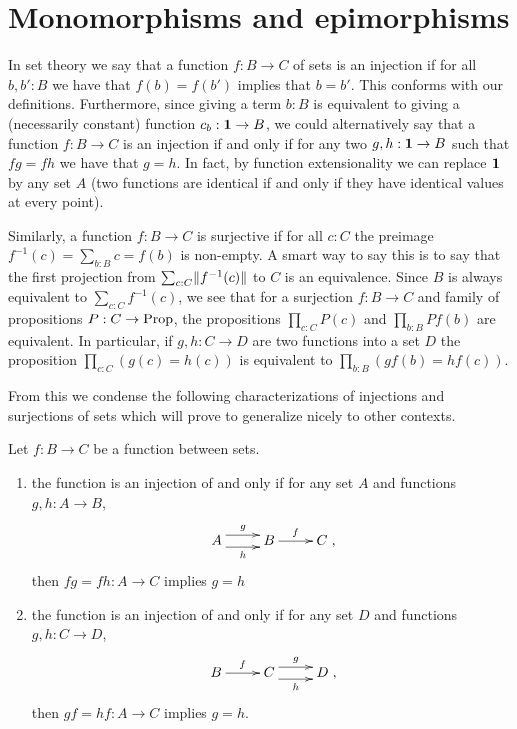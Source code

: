 \section{Monomorphisms and epimorphisms}
\label{sec:monoepi}


In set theory we say that a function $f:B\to C$ of sets is an injection if for all $b,b':B$ we have that $f(b)=f(b')$ implies that  $b=b'$.  This conforms with our definitions.
Furthermore, since giving a term $b:B$ is equivalent to giving a (necessarily constant) function $c_b:\mathbf{1}\to B$, we could alternatively say that a function $f:B\to C$ is an injection if and only if for any two $g,h:\mathbf{1}\to B$ such that $fg=fh$ we have that $g=h$.  In fact, by function extensionality we can replace $\mathbf{1}$ by any set $A$ (two functions are identical if and only if they have identical values at every point).

Similarly, a function $f:B\to C$ is surjective if for all $c:C$ the preimage $f^{-1}(c)=\sum_{b:B}c=f(b)$ is non-empty.  A smart way to say this is to say that the first projection from $\sum_{c:C}\lVert f^{-1}(c)\rVert$ to $C$ is an equivalence.  Since $B$ is always equivalent to $\sum_{c:C}f^{-1}(c)$, we see that for a surjection $f:B\to C$ and family of propositions $P:C\to \mathord{\mathrm{Prop}}$, the propositions $\prod_{c:C}P(c)$ and $\prod_{b:B}Pf(b)$ are equivalent.  In particular, if $g,h:C\to D$ are two functions into a set $D$ the proposition $\prod_{c:C}(g(c)=h(c))$ is equivalent to $\prod_{b:B}(gf(b)=hf(c))$. 

From this we condense the following characterizations of injections and surjections of sets which will prove to generalize nicely to other contexts.
\begin{lemma}
  \label{lem:injofsetsaremono}Let $f:B\to C$ be a function between sets.
  \begin{enumerate}
  \item the function is an injection of and only if for any set $A$ and functions $g,h:A\to B$, 
$$\xymatrix{A\ar@<1ex>[r]^g\ar@<-1ex>[r]_h&B\ar[r]^f&C},$$  then $fg=fh:A\to C$ implies $g=h$
\item the function is an injection of and only if for any set $D$ and functions $g,h:C\to D$, 
$$\xymatrix{B\ar[r]^f&C\ar@<1ex>[r]^g\ar@<-1ex>[r]_h&D},$$  then $gf=hf:A\to C$ implies $g=h$.
  \end{enumerate}
\end{lemma}

